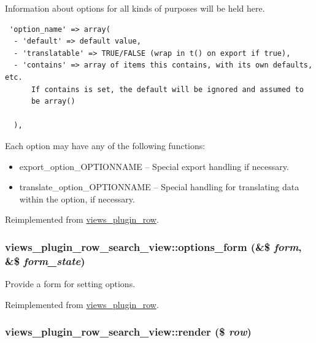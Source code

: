 Information about options for all kinds of purposes will be held here. 

\begin{Code}\begin{verbatim} 'option_name' => array(
  - 'default' => default value,
  - 'translatable' => TRUE/FALSE (wrap in t() on export if true),
  - 'contains' => array of items this contains, with its own defaults, etc.
      If contains is set, the default will be ignored and assumed to
      be array()

  ),
\end{verbatim}
\end{Code}

 Each option may have any of the following functions:\begin{itemize}
\item export\_\-option\_\-OPTIONNAME -- Special export handling if necessary.\item translate\_\-option\_\-OPTIONNAME -- Special handling for translating data within the option, if necessary. \end{itemize}


Reimplemented from \hyperlink{classviews__plugin__row_ad6be1492eae8605e9aff37da9f19337}{views\_\-plugin\_\-row}.\hypertarget{classviews__plugin__row__search__view_2d2e479f414c487aff3d88343274b49b}{
\subsubsection[{options\_\-form}]{\setlength{\rightskip}{0pt plus 5cm}views\_\-plugin\_\-row\_\-search\_\-view::options\_\-form (\&\$ {\em form}, \/  \&\$ {\em form\_\-state})}}
\label{classviews__plugin__row__search__view_2d2e479f414c487aff3d88343274b49b}


Provide a form for setting options. 

Reimplemented from \hyperlink{classviews__plugin__row_6914c39d64977a0aa71da39cc1af004e}{views\_\-plugin\_\-row}.\hypertarget{classviews__plugin__row__search__view_ec0c01f2e90075589b38f73381aa4ce7}{
\subsubsection[{render}]{\setlength{\rightskip}{0pt plus 5cm}views\_\-plugin\_\-row\_\-search\_\-view::render (\$ {\em row})}}
\label{classviews__plugin__row__search__view_ec0c01f2e90075589b38f73381aa4ce7}


